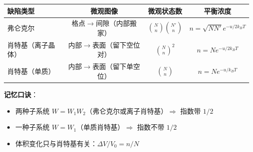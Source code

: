\begin{thinkbox}
\begin{center}
\begin{tabular}{lccc}
\toprule
\textbf{缺陷类型} & \textbf{微观图像} & \textbf{微观状态数} & \textbf{平衡浓度} \\
\midrule
弗仑克尔 & 格点$\to$间隙（内部搬家） & $\displaystyle\binom{N}{n}\binom{N'}{n}$ & $\displaystyle n=\sqrt{NN'}e^{-u/2k_{\!B}T}$ \\
肖特基（离子晶体） & 内部$\to$表面（留下空位对） & $\displaystyle\binom{N}{n}^2$ & $\displaystyle n=N e^{-u/2k_{\!B}T}$ \\
肖特基（单质） & 内部$\to$表面（留下单空位） & $\displaystyle\binom{N}{n}$ & $\displaystyle n=N e^{-u/k_{\!B}T}$ \\
\bottomrule
\end{tabular}
\end{center}
\vspace{4pt}
\textbf{记忆口诀}：
\begin{itemize}
    \item 两种子系统 $W=W_1W_2$（弗仑克尔或离子肖特基）$\Rightarrow$ 指数带 $1/2$
    \item 一种子系统 $W=W_1$（单质肖特基）$\Rightarrow$ 指数不带 $1/2$
    \item 体积变化只与肖特基有关：$\Delta V/V_0 = n/N$
\end{itemize}
\end{thinkbox}
